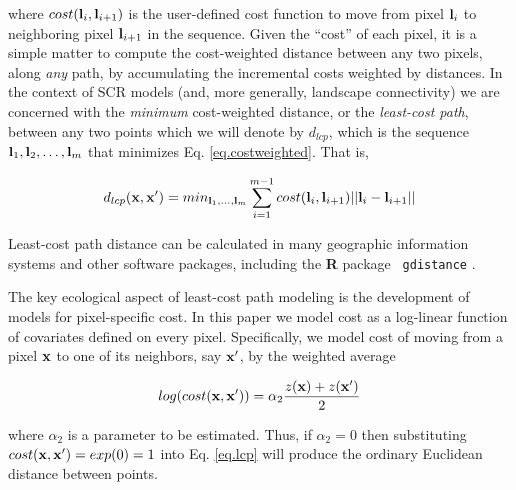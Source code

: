 \documentclass[12pt]{article}
\begin{document}
\begin{spacing}{1.8}
{\flushleft
where } $cost({\bf l}_{i},{\bf l}_{i+1})$ is the user-defined cost function
to move
from pixel ${\bf l}_{i}$ to neighboring pixel ${\bf l}_{i+1}$ in the sequence.
Given the ``cost'' of each pixel, it is a simple matter to compute the
cost-weighted distance between any two pixels, along {\it any} path,
by accumulating the incremental  costs weighted by
distances.
In the context of
SCR models (and, more generally, landscape
connectivity) we are concerned with the {\it minimum} cost-weighted
distance, or the {\it least-cost path}, between any two points which
we will denote by $d_{lcp}$, which is
the
sequence ${\bf l}_{1},{\bf l}_{2},\ldots,{\bf l}_{m}$ that minimizes
Eq. \ref{eq.costweighted}. That is,

\begin{equation}
 d_{lcp}({\bf x},{\bf x}')
  =  min_{{\bf l}_{1},\ldots,{\bf l}_{m}}  \sum_{i=1}^{m-1} cost({\bf l}_{i},{\bf l}_{i+1})||{\bf l}_{i} - {\bf l}_{i+1}||
\label{eq.lcp}
\end{equation}

{\flushleft
 Least-cost} path distance can be calculated in
 many geographic information systems and other software packages,
including the {\bf R} package \mbox{\tt
  gdistance} \citep{vanetten:2011}.


The key ecological aspect of least-cost path modeling is the
development
of models for pixel-specific cost.
In this paper we model cost as a log-linear function of covariates
defined on every pixel.
Specifically, we model cost of
moving from a pixel ${\bf x}$ to one of its neighbors, say ${\bf
  x}'$, by the weighted average

\begin{equation}
 log(cost({\bf x},{\bf x}'))=  \alpha_{2} \frac{z({\bf x})+z({\bf x}')}{2}
\label{eq.cost}
\end{equation}

{\flushleft
where $\alpha_{2}$ is a parameter to be estimated.} Thus, if $\alpha_{2} = 0$ then substituting $cost({\bf x},{\bf x}')
=exp(0) = 1$ into
Eq. \ref{eq.lcp} will produce the ordinary Euclidean distance
between points.


\end{spacing}
\end{document}
